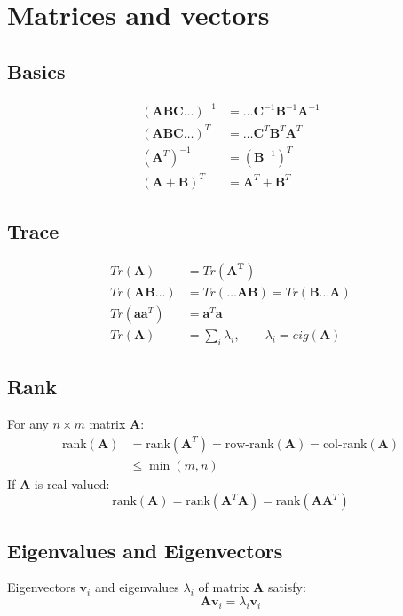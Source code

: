 \chapter{Matrices and vectors}

\section{Basics}
\begin{align}
  (\bm{ABC}\ldots)^{-1} &= \ldots \bm{C}^{-1} \bm{B}^{-1} \bm{A}^{-1} \\
  (\bm{ABC}\ldots)^{T} &= \ldots \bm{C}^{T} \bm{B}^{T} \bm{A}^{T} \\
  (\bm{A}^T)^{-1} &= (\bm{B}^{-1})^T \\
  (\bm{A} + \bm{B})^T &= \bm{A}^T + \bm{B}^T
\end{align}

\section{Trace}
\begin{align}
  Tr(\bm{A}) &= Tr(\bm{A^T}) \\
  Tr(\bm{A} \bm{B} \ldots) &= Tr(\ldots \bm{A} \bm{B}) = Tr(\bm{B}\ldots \bm{A}) \\
  Tr(\bm{aa}^T) &= \bm{a}^T \bm{a}\\
  Tr(\bm{A}) &= \sum_i \lambda_i, \qquad \lambda_i = eig(\bm{A})
\end{align}

\section{Rank}
For any $n \times m$ matrix $\bm{A}$:
\begin{align}
	\text{rank}(\bm{A}) &= \text{rank}(\bm{A}^T) = \text{row-rank}(\bm{A}) = \text{col-rank}(\bm{A})\\
	& \leq \min(m, n)
\end{align}
If $\bm{A}$ is real valued:
\begin{equation}
	\text{rank}(\bm{A}) = \text{rank}(\bm{A}^T \bm{A}) = \text{rank}(\bm{A} \bm{A}^T)
\end{equation}

\section{Eigenvalues and Eigenvectors}
Eigenvectors $\bm{v}_i$ and eigenvalues $\lambda_i$ of matrix $\bm{A}$ satisfy:
\begin{equation}
  \bm{Av}_i = \lambda_i\bm{v}_i
\end{equation}
